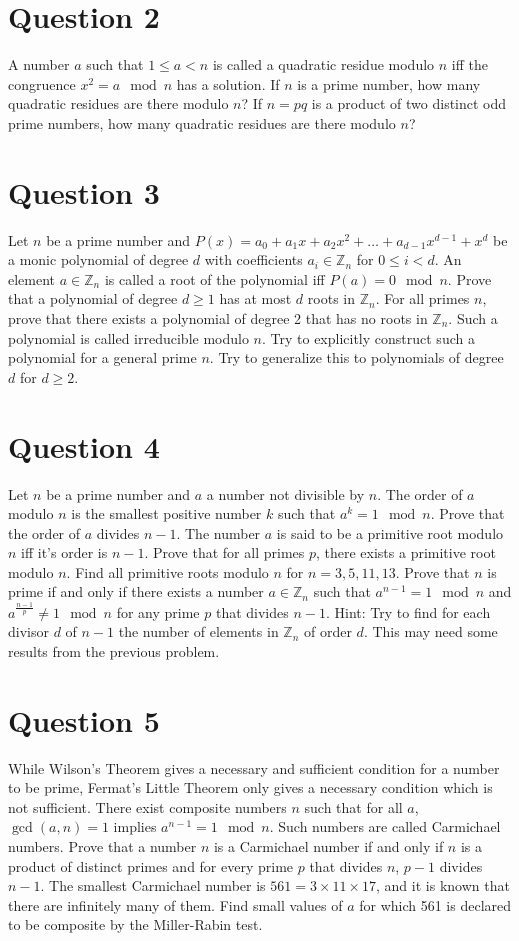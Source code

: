 \documentclass[12pt]{report}
\begin{document}
\section*{Question 2}
A number $a$ such that $1 \leq a < n$ is called a quadratic residue modulo $n$ iff the congruence $x^2 = a \mod n$ has a solution. If $n$ is a prime number, how many quadratic residues are there modulo $n$? If $n = pq$ is a product of two distinct odd prime numbers, how many quadratic residues are there modulo $n$?
\section*{Question 3}
Let $n$ be a prime number and $P(x) = a_{0} + a_{1}x + a_{2}x^2 + \dots + a_{d - 1}x^{d - 1} + x^{d}$ be a monic polynomial of degree $d$ with coefficients $a_{i} \in \mathbb{Z}_{n}$ for $0 \leq i < d$. An element $a \in \mathbb{Z}_{n}$ is called a root of the polynomial iff $P(a) = 0 \mod n$. Prove that a polynomial of degree $d \geq 1$ has at most $d$ roots in $\mathbb{Z}_{n}$. For all primes $n$, prove that there exists a polynomial of degree 2 that has no roots in $\mathbb{Z}_{n}$. Such a polynomial is called irreducible modulo $n$. Try to explicitly construct such a polynomial for a general prime $n$. Try to generalize this to polynomials of degree $d$ for $d \geq 2$.
\section*{Question 4}
Let $n$ be a prime number and $a$ a number not divisible by $n$. The order of $a$ modulo $n$ is the smallest positive number $k$ such that $a^{k} = 1 \mod n$. Prove that the order of $a$ divides $n - 1$. The number $a$ is said to be a primitive root modulo $n$ iff it's order is $n - 1$. Prove that for all primes $p$, there exists a primitive root modulo $n$. Find all primitive roots modulo $n$ for $n = 3, 5, 11, 13$. Prove that $n$ is prime if and only if there exists a number $a \in \mathbb{Z}_{n}$ such that $a^{n - 1} = 1 \mod n$ and $a^{\frac{n - 1}{p}} \neq 1 \mod n$ for any prime $p$ that divides $n - 1$. Hint: Try to find for each divisor $d$ of $n - 1$ the number of elements in $\mathbb{Z}_{n}$ of order $d$. This may need some results from the previous problem.
\section*{Question 5}
While Wilson's Theorem gives a necessary and sufficient condition for a number to be prime, Fermat's Little Theorem only gives a necessary condition which is not sufficient. There exist composite numbers $n$ such that for all $a$, $\gcd(a, n) = 1$ implies $a^{n - 1} = 1 \mod n$. Such numbers are called Carmichael numbers. Prove that a number $n$ is a Carmichael number if and only if $n$ is a product of distinct primes and for every prime $p$ that divides $n$, $p - 1$ divides $n - 1$. The smallest Carmichael number is $561 = 3 \times 11 \times 17$, and it is known that there are infinitely many of them. Find small values of $a$ for which 561 is declared to be composite by the Miller-Rabin test.
\end{document}
